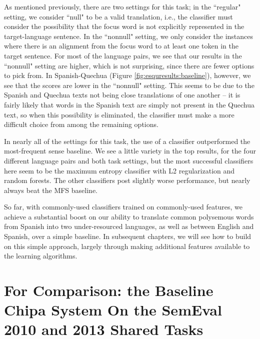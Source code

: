 As mentioned previously, there are two settings for this task; in the
``regular" setting, we consider ``null" to be a valid translation, i.e., the
classifier must consider the possibility that the focus word is not explicitly
represented in the target-language sentence. In the ``nonnull" setting, we only
consider the instances where there is an alignment from the focus word to at
least one token in the target sentence. For most of the language pairs, we see
that our results in the ``nonnull" setting are higher, which is not surprising,
since there are fewer options to pick from. In Spanish-Quechua (Figure
\ref{fig:esquresults:baseline}), however, we see
that the scores are lower in the ``nonnull" setting. This seems to be due to
the Spanish and Quechua texts not being close translations of one another -- it
is fairly likely that words in the Spanish text are simply not present in the
Quechua text, so when this possibility is eliminated, the classifier must make
a more difficult choice from among the remaining options.

In nearly all of the settings for this task, the use of a classifier
outperformed the most-frequent sense baseline. We see a little variety in the
top results, for the four different language pairs and both task settings, but
the most successful classifiers here seem to be the maximum entropy classifier
with L2 regularization and random forests. The other classifiers post slightly
worse performance, but nearly always beat the MFS baseline.

So far, with commonly-used classifiers trained on commonly-used features, we
achieve a substantial boost on our ability to translate common polysemous words
from Spanish into two under-resourced languages, as well as between English and
Spanish, over a simple baseline. In subsequent chapters, we will see how to
build on this simple approach, largely through making additional features
available to the learning algorithms.

\section{For Comparison: the Baseline Chipa System On the SemEval 2010 and 2013
Shared Tasks}
\label{sec:baseline-semeval}

